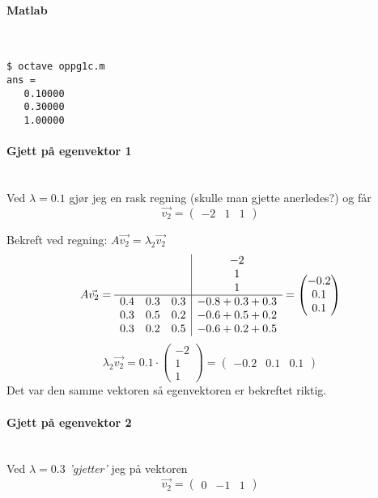 \paragraph{Matlab} \mbox{} \\

\begin{lstlisting}[caption=Output]
$ octave oppg1c.m
ans =
   0.10000
   0.30000
   1.00000
\end{lstlisting}



\paragraph{Gjett på egenvektor 1} \mbox{} \\
Ved $\lambda = 0.1$ gjør jeg en rask regning (skulle man gjette anerledes?)
og får $$\vec{v_2} = \begin{pmatrix} -2 & 1 & 1 \end{pmatrix}$$

Bekreft ved regning: $A\vec{v_2} = \lambda_2 \vec{v_2}$
$$A\vec{v_2} = \begin{array}{c c c|c}
                   & & & -2 \\
                   & & & 1 \\
                   & & & 1 \\
                  \hline
                  0.4 & 0.3 & 0.3 & -0.8 + 0.3 + 0.3 \\
                  0.3 & 0.5 & 0.2 & -0.6 + 0.5 + 0.2 \\
                  0.3 & 0.2 & 0.5 & -0.6 + 0.2 + 0.5
                  \end{array}
             = \begin{pmatrix} -0.2 \\ 0.1 \\ 0.1 \end{pmatrix}$$
$$\lambda_2\vec{v_2} = 0.1\cdot \begin{pmatrix} -2 \\ 1 \\ 1 \end{pmatrix}
                     = \begin{pmatrix} -0.2 & 0.1 & 0.1 \end{pmatrix}$$
Det var den samme vektoren så egenvektoren er bekreftet riktig.



\paragraph{Gjett på egenvektor 2} \mbox{} \\
Ved $\lambda = 0.3$ \emph{'gjetter'} jeg på vektoren
$$\vec{v_2} = \begin{pmatrix} 0 & -1 & 1 \end{pmatrix}$$

